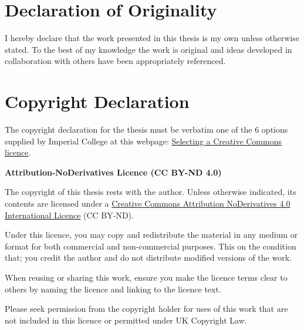 \cleardoublepage{}
{}\mtcaddchapter 
\chapter*{Declaration of Originality}
\addtocounter{counter}{-1}




I hereby declare that the work presented in this thesis is my own unless otherwise stated. To the best of my knowledge the work is original and ideas developed in collaboration with others have been appropriately referenced.


\cleardoublepage{}
{}\mtcaddchapter 
\chapter*{Copyright Declaration}
\addtocounter{counter}{-1}



{\color{red}The copyright declaration for the thesis must be verbatim one of the 6 options supplied by Imperial College at this webpage: \href{https://www.imperial.ac.uk/research-and-innovation/support-for-staff/scholarly-communication/open-access/theses/selecting-a-creative-commons-licence/}{Selecting a Creative Commons licence}.}

\textbf{Attribution-NoDerivatives Licence (CC BY-ND 4.0)}

The copyright of this thesis rests with the author. Unless otherwise indicated, its contents are licensed under a \href{https://creativecommons.org/licenses/by-nd/4.0/}{Creative Commons Attribution NoDerivatives 4.0 International Licence}  (CC BY-ND).

Under this licence, you may copy and redistribute the material in any medium or format for both commercial and non-commercial purposes.  This on the condition that; you credit the author and do not distribute modified versions of the work.

When reusing or sharing this work, ensure you make the licence terms clear to others by naming the licence and linking to the licence text.

Please seek permission from the copyright holder for uses of this work that are not included in this licence or permitted under UK Copyright Law.
